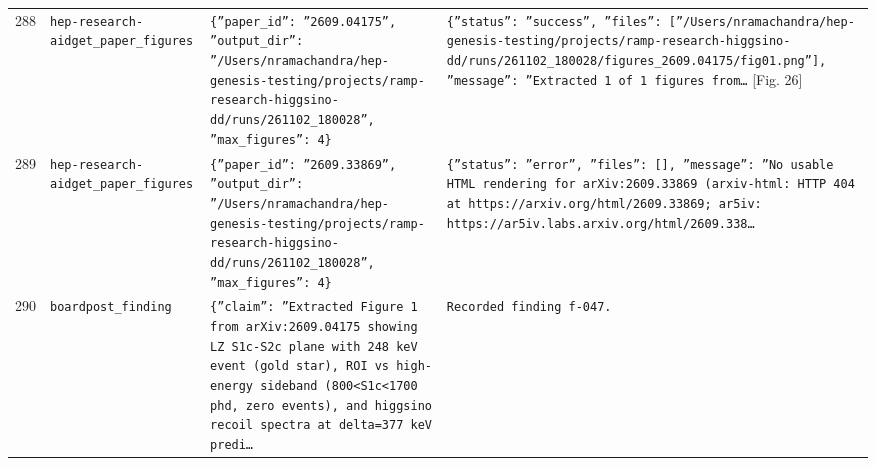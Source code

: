 \documentclass[11pt,a4paper]{article}
\begin{document}
\begin{longtable}{@{}p{}p{}p{}p{}@{}}
288 & \texttt{hep-research-aid}\newline\texttt{get\_\allowbreak{}paper\_\allowbreak{}figures} & \texttt{\{''paper\_\allowbreak{}id'':\allowbreak{} ''2609.04175'',\allowbreak{} ''output\_\allowbreak{}dir'':\allowbreak{} ''/\allowbreak{}Users/\allowbreak{}nramachandra/\allowbreak{}hep-genesis-testing/\allowbreak{}projects/\allowbreak{}ramp-research-higgsino-dd/\allowbreak{}runs/\allowbreak{}261102\_\allowbreak{}180028'',\allowbreak{} ''max\_\allowbreak{}figures'':\allowbreak{} 4\}\allowbreak{}} & \texttt{\{''status'':\allowbreak{} ''success'',\allowbreak{} ''files'':\allowbreak{} [''/\allowbreak{}Users/\allowbreak{}nramachandra/\allowbreak{}hep-genesis-testing/\allowbreak{}projects/\allowbreak{}ramp-research-higgsino-dd/\allowbreak{}runs/\allowbreak{}261102\_\allowbreak{}180028/\allowbreak{}figures\_\allowbreak{}2609.04175/\allowbreak{}fig01.png'']\allowbreak{},\allowbreak{} ''message'':\allowbreak{} ''Extracted 1 of 1 figures from\ldots{}\allowbreak{}} [Fig. 26] \\
289 & \texttt{hep-research-aid}\newline\texttt{get\_\allowbreak{}paper\_\allowbreak{}figures} & \texttt{\{''paper\_\allowbreak{}id'':\allowbreak{} ''2609.33869'',\allowbreak{} ''output\_\allowbreak{}dir'':\allowbreak{} ''/\allowbreak{}Users/\allowbreak{}nramachandra/\allowbreak{}hep-genesis-testing/\allowbreak{}projects/\allowbreak{}ramp-research-higgsino-dd/\allowbreak{}runs/\allowbreak{}261102\_\allowbreak{}180028'',\allowbreak{} ''max\_\allowbreak{}figures'':\allowbreak{} 4\}\allowbreak{}} & \texttt{\{''status'':\allowbreak{} ''error'',\allowbreak{} ''files'':\allowbreak{} []\allowbreak{},\allowbreak{} ''message'':\allowbreak{} ''No usable HTML rendering for arXiv:\allowbreak{}2609.33869 (arxiv-html:\allowbreak{} HTTP 404 at https:\allowbreak{}/\allowbreak{}/\allowbreak{}arxiv.org/\allowbreak{}html/\allowbreak{}2609.33869;\allowbreak{} ar5iv:\allowbreak{} https:\allowbreak{}/\allowbreak{}/\allowbreak{}ar5iv.labs.arxiv.org/\allowbreak{}html/\allowbreak{}2609.338\ldots{}\allowbreak{}} \\
290 & \texttt{board}\newline\texttt{post\_\allowbreak{}finding} & \texttt{\{''claim'':\allowbreak{} ''Extracted Figure 1 from arXiv:\allowbreak{}2609.04175 showing LZ S1c-S2c plane with 248 keV event (gold star)\allowbreak{},\allowbreak{} ROI vs high-energy sideband (800\textless{}\allowbreak{}S1c\textless{}\allowbreak{}1700 phd,\allowbreak{} zero events)\allowbreak{},\allowbreak{} and higgsino recoil spectra at delta=\allowbreak{}377 keV predi\ldots{}\allowbreak{}} & \texttt{Recorded finding f-047.} \\

\end{longtable}
\end{document}
